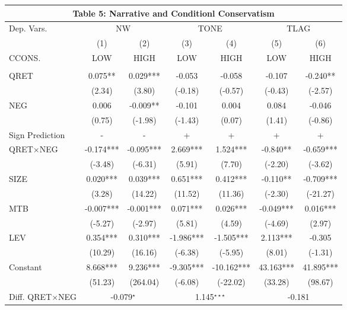 \begin{table}[htbp] \label{T5}
  \centering
    \begin{tabular}{lcccccc}
    \multicolumn{7}{c}{\textbf{Table 5: Narrative and Conditionl Conservatism}} \\
    \midrule
    \midrule
    Dep. Vars. & \multicolumn{2}{c}{NW} & \multicolumn{2}{c}{TONE} & \multicolumn{2}{c}{TLAG} \\
    \cmidrule{2-7}
      & (1) & (2) & (3) & (4) & (5) & (6) \\
    CCONS. & LOW & HIGH & LOW & HIGH & LOW & HIGH \\
    \midrule
      &   &   &   &   &   &  \\
    QRET & 0.075** & 0.029*** & -0.053 & -0.058 & -0.107 & -0.240** \\
      & (2.34) & (3.80) & (-0.18) & (-0.57) & (-0.43) & (-2.57) \\
    NEG & 0.006 & -0.009** & -0.101 & 0.004 & 0.084 & -0.046 \\
      & (0.75) & (-1.98) & (-1.43) & (0.07) & (1.41) & (-0.86) \\
    \rowcolor[rgb]{ .933,  .925,  .882} Sign Prediction & - & - & + & + & + & + \\
    \rowcolor[rgb]{ .933,  .925,  .882} QRET$\times$NEG & -0.174*** & -0.095*** & 2.669*** & 1.524*** & -0.840** & -0.659*** \\
    \rowcolor[rgb]{ .933,  .925,  .882}   & (-3.48) & (-6.31) & (5.91) & (7.70) & (-2.20) & (-3.62) \\
    SIZE & 0.020*** & 0.039*** & 0.651*** & 0.412*** & -0.110** & -0.709*** \\
      & (3.28) & (14.22) & (11.52) & (11.36) & (-2.30) & (-21.27) \\
    MTB & -0.007*** & -0.001*** & 0.071*** & 0.026*** & -0.049*** & 0.016*** \\
      & (-5.27) & (-2.97) & (5.81) & (4.59) & (-4.69) & (2.97) \\
    LEV & 0.354*** & 0.310*** & -1.986*** & -1.505*** & 2.113*** & -0.305 \\
      & (10.29) & (16.16) & (-6.38) & (-5.95) & (8.01) & (-1.31) \\
    Constant & 8.668*** & 9.236*** & -9.305*** & -10.162*** & 43.163*** & 41.895*** \\
      & (51.23) & (264.04) & (-6.08) & (-22.02) & (33.28) & (98.67) \\
    \rowcolor[rgb]{ .933,  .925,  .882} Diff. QRET$\times$NEG & \multicolumn{2}{c}{ -0.079$^{\star}$} & \multicolumn{2}{c}{1.145$^{\star\star\star}$} & \multicolumn{2}{c}{-0.181} \\

\end{tabular}
\end{table}
